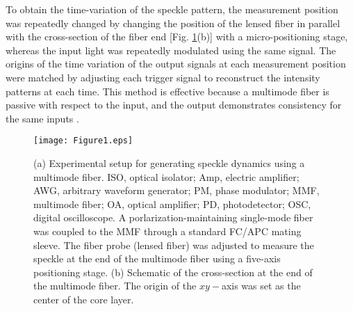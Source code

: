 \documentclass{article}
\begin{document}
To obtain the time-variation of the speckle pattern,  
the measurement position was repeatedly changed by changing the position of
the lensed fiber in parallel with the cross-section of the fiber end
[Fig. \ref{fig1}(b)] with a micro-positioning stage, whereas
the input light was repeatedly modulated using the same signal.
%
The origins of the time variation of the output signals at each
measurement position were matched by adjusting each trigger signal
to reconstruct the intensity patterns at each time.
%
This method is effective because a multimode fiber is passive with
respect to the input,
and the output demonstrates consistency for the same inputs \cite{Uchida2004}.

\begin{figure}[htbp]
\centering\texttt{[image: Figure1.eps]}
\caption{\label{fig1}
(a) Experimental setup for generating speckle dynamics using a multimode
 fiber. 
%
ISO, optical isolator; Amp, electric amplifier; AWG, arbitrary waveform
 generator; PM, phase modulator;
 MMF, multimode fiber; OA, optical amplifier; PD, photodetector; OSC,
 digital oscilloscope.
%
A porlarization-maintaining single-mode fiber was coupled to the MMF through
 a standard FC/APC mating sleeve.
%
The fiber probe (lensed fiber) was adjusted to measure the speckle at the end of the
 multimode fiber using a five-axis positioning stage.
%
(b) Schematic of the cross-section at the end of the multimode fiber.
%
The origin of the $xy-$axis was set as the center of the core layer. 
}
\end{figure}
%
\end{document}
